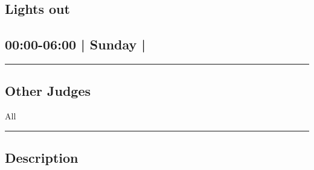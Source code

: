 \documentclass[10pt, A5]{article}
\begin{document}
		\begin{framed}
			\begin{minipage}{\textwidth}

			\setcounter{section}{88}
							\section{Lights out}
						
			\subsection*{00:00-06:00 | Sunday | }

			\vspace{0.25cm}
			\hrule
			\vspace{0.25cm}


			\subsection*{Other Judges}
							All

					\vspace{0.25cm}
			\hrule
			\vspace{0.25cm}

			\begin{minipage}{\textwidth}
			\subsection*{\faListAlt \: Description}
			
			\end{minipage}


	\end{minipage}
	\end{framed}

	
\end{document}
